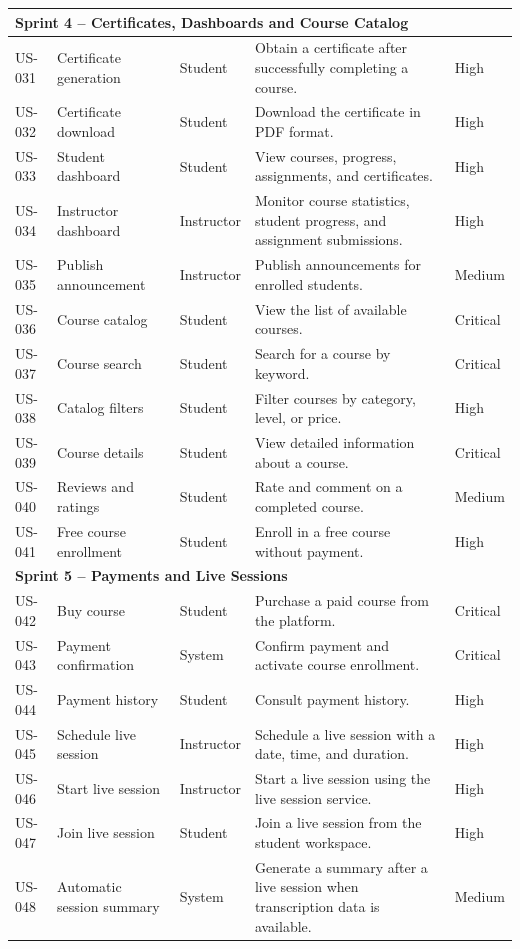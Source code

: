 \begin{longtable}{|p{1.3cm}|p{3cm}|p{2.4cm}|p{7.2cm}|p{1.7cm}|}
  \multicolumn{5}{|l|}{\cellcolor{gray!15}\textbf{Sprint 4 -- Certificates, Dashboards and Course Catalog}} \\
  \hline
  US-031 & Certificate generation & Student & Obtain a certificate after successfully completing a course. & High \\
  \hline
  US-032 & Certificate download & Student & Download the certificate in PDF format. & High \\
  \hline
  US-033 & Student dashboard & Student & View courses, progress, assignments, and certificates. & High \\
  \hline
  US-034 & Instructor dashboard & Instructor & Monitor course statistics, student progress, and assignment submissions. & High \\
  \hline
  US-035 & Publish announcement & Instructor & Publish announcements for enrolled students. & Medium \\
  \hline
  US-036 & Course catalog & Student & View the list of available courses. & Critical \\
  \hline
  US-037 & Course search & Student & Search for a course by keyword. & Critical \\
  \hline
  US-038 & Catalog filters & Student & Filter courses by category, level, or price. & High \\
  \hline
  US-039 & Course details & Student & View detailed information about a course. & Critical \\
  \hline
  US-040 & Reviews and ratings & Student & Rate and comment on a completed course. & Medium \\
  \hline
  US-041 & Free course enrollment & Student & Enroll in a free course without payment. & High \\
  \hline

  \multicolumn{5}{|l|}{\cellcolor{gray!15}\textbf{Sprint 5 -- Payments and Live Sessions}} \\
  \hline
  US-042 & Buy course & Student & Purchase a paid course from the platform. & Critical \\
  \hline
  US-043 & Payment confirmation & System & Confirm payment and activate course enrollment. & Critical \\
  \hline
  US-044 & Payment history & Student & Consult payment history. & High \\
  \hline
  US-045 & Schedule live session & Instructor & Schedule a live session with a date, time, and duration. & High \\
  \hline
  US-046 & Start live session & Instructor & Start a live session using the live session service. & High \\
  \hline
  US-047 & Join live session & Student & Join a live session from the student workspace. & High \\
  \hline
  US-048 & Automatic session summary & System & Generate a summary after a live session when transcription data is available. & Medium \\
  \hline


\end{longtable}
